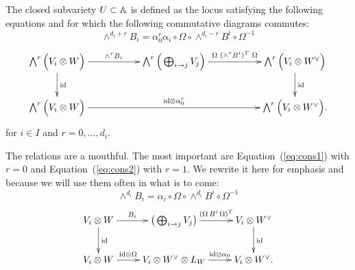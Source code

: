 \documentclass{amsart}
\theoremstyle{definition}
\begin{document}
\begin{definition}\label{def:equa}
The closed subvariety $U \subset \mathbb{A}$ is defined as the locus satisfying the following equations and for which the following commutative diagrams commutes:
\begin{equation}\label{eq:cons1}
    \wedge^{d_i+r} B_i = \alpha_0^r \alpha_i \circ \Omega \circ \wedge^{d_i-r} B^i \circ \Omega^{-1}
\end{equation}
\begin{equation}\label{eq:cons2}
\begin{gathered}
    \xymatrix{\bigwedge^{r} \Big(V_i \otimes W\Big) \ar[rr]^-{\wedge^r B_i} \ar[d]^{\textup{id}} && \bigwedge^r \Big(\bigoplus_{i \rightarrow j}  V_j\Big) \ar[rr]^-{\Omega\,\,(\wedge^{r} B^i)^T \,\, \Omega} && \bigwedge^r \Big(V_i \otimes W^\vee\Big) \ar[d]^{\textup{id}} \\
    \bigwedge^r \Big(V_i \otimes W\Big) \ar[rrrr]^-{\textup{id} \otimes \alpha_0^r}
    &&&& \bigwedge^r \Big(V_i \otimes W^\vee\Big).}
    \end{gathered}
\end{equation}
for $i\in I$ and $r=0,\ldots,d_i$.
\end{definition}

The relations are a mouthful.
The most important are Equation~(\ref{eq:cons1}) with $r=0$ and Equation~(\ref{eq:cons2}) with $r=1$.
We rewrite it here for emphasis and because we will use them often in what is to come:
\begin{equation}\label{eq2:cons2}
    \wedge^{d_i} B_i =  \alpha_i \circ \Omega \circ \wedge^{d_i} B^i \circ \Omega^{-1}
\end{equation}
\begin{equation}\label{eq:comdiag}
\begin{gathered}
    \xymatrix{V_i \otimes W \ar[r]^-{B_i} \ar[d]^{\textup{id}} & \big(\bigoplus_{i \rightarrow j}  V_j\big) \ar[r]^-{(\Omega\,B^i \, \Omega)^T} & V_i \otimes W^\vee \ar[d]^{\textup{id}} \\
    V_i \otimes W \ar[r]^-{\textup{id} \otimes \Omega} & V_i \otimes W^\vee \otimes L_W \ar[r]^-{\textup{id} \otimes \alpha_0} & V_i \otimes W^\vee.}
    \end{gathered}
\end{equation}
\end{document}
